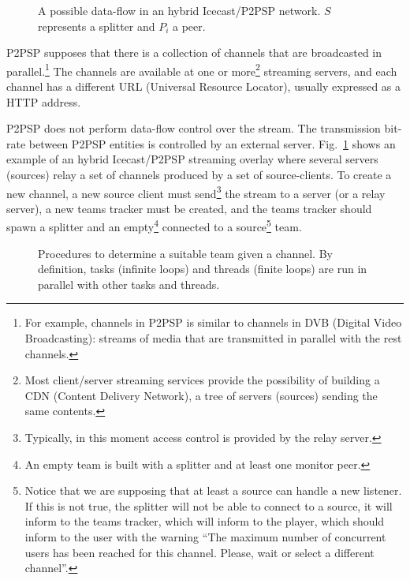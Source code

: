 \label{sec:TTS}

\begin{figure}
   \caption{A possible data-flow in an
  hybrid Icecast/P2PSP network. $S$ represents a splitter and $P_i$ a
  peer.\label{fig:icecast-P2PSP}}
\end{figure}

P2PSP supposes that there is a collection of channels that are
broadcasted in parallel.\footnote{For example, channels in P2PSP is
  similar to channels in DVB (Digital Video Broadcasting): streams of
  media that are transmitted in parallel with the rest channels.} The
channels are available at one or more\footnote{Most client/server
  streaming services provide the possibility of building a CDN
  (Content Delivery Network), a tree of servers (sources) sending the
  same contents.} streaming servers, and each channel has a different
URL (Universal Resource Locator), usually expressed as a HTTP
address.

P2PSP does not perform data-flow control over the stream. The
transmission bit-rate between P2PSP entities is controlled by an
external server. Fig.~\ref{fig:icecast-P2PSP} shows an example of an
hybrid Icecast/P2PSP streaming overlay where several servers (sources)
relay a set of channels produced by a set of source-clients.
To create a new channel, a new source client must
send\footnote{Typically, in this moment access control is provided by
  the relay server.} the stream to a server (or a relay server), a new
teams tracker must be created, and the teams tracker should spawn a
splitter and an empty\footnote{An empty team is built with a splitter
  and at least one monitor peer.} connected to a
source\footnote{Notice that we are supposing that at least a source
  can handle a new listener. If this is not true, the splitter will
  not be able to connect to a source, it will inform to the teams
  tracker, which will inform to the player, which should inform to the
  user with the warning ``The maximum number of concurrent users has
  been reached for this channel. Please, wait or select a different
  channel''.} team.

\begin{figure*}
   \caption{Procedures to determine a suitable team
    given a channel. By definition, tasks (infinite loops) and threads
    (finite loops) are run in parallel with other tasks and
    threads.\label{fig:TTS}}
\end{figure*}

